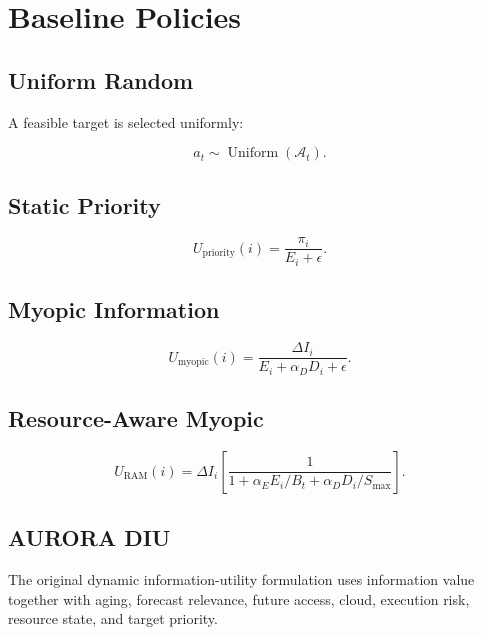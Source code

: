 \documentclass[11pt,a4paper]{article}
\begin{document}

\section{Baseline Policies}

\subsection{Uniform Random}

A feasible target is selected uniformly:

\begin{equation}
a_t
\sim
\operatorname{Uniform}(\mathcal A_t).
\end{equation}

\subsection{Static Priority}

\begin{equation}
U_{\mathrm{priority}}(i)
=
\frac{\pi_i}{E_i+\epsilon}.
\end{equation}

\subsection{Myopic Information}

\begin{equation}
U_{\mathrm{myopic}}(i)
=
\frac{
\Delta I_i
}{
E_i+\alpha_DD_i+\epsilon
}.
\end{equation}

\subsection{Resource-Aware Myopic}

\begin{equation}
U_{\mathrm{RAM}}(i)
=
\Delta I_i
\left[
\frac{1}{
1+
\alpha_EE_i/B_t+
\alpha_DD_i/S_{\max}
}
\right].
\end{equation}

\subsection{AURORA DIU}

The original dynamic information-utility formulation uses
information value together with aging, forecast relevance, future
access, cloud, execution risk, resource state, and target priority.
\end{document}
